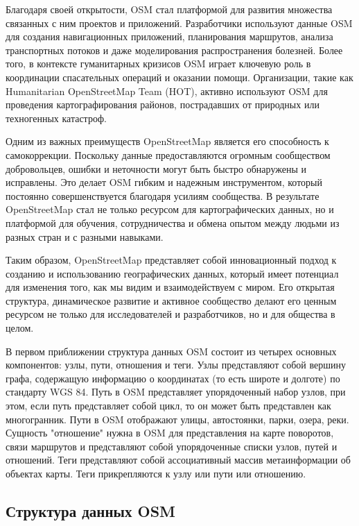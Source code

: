 Благодаря своей открытости, OSM стал платформой для развития множества связанных с ним проектов и приложений. Разработчики используют данные OSM для создания навигационных приложений, планирования маршрутов, анализа транспортных потоков и даже моделирования распространения болезней. Более того, в контексте гуманитарных кризисов OSM играет ключевую роль в координации спасательных операций и оказании помощи. Организации, такие как Humanitarian OpenStreetMap Team (HOT), активно используют OSM для проведения картографирования районов, пострадавших от природных или техногенных катастроф.

Одним из важных преимуществ OpenStreetMap является его способность к самокоррекции. Поскольку данные предоставляются огромным сообществом добровольцев, ошибки и неточности могут быть быстро обнаружены и исправлены. Это делает OSM гибким и надежным инструментом, который постоянно совершенствуется благодаря усилиям сообщества. В результате OpenStreetMap стал не только ресурсом для картографических данных, но и платформой для обучения, сотрудничества и обмена опытом между людьми из разных стран и с разными навыками.

Таким образом, OpenStreetMap представляет собой инновационный подход к созданию и использованию географических данных, который имеет потенциал для изменения того, как мы видим и взаимодействуем с миром. Его открытая структура, динамическое развитие и активное сообщество делают его ценным ресурсом не только для исследователей и разработчиков, но и для общества в целом.

В первом приближении структура данных OSM состоит из четырех основных компонентов: узлы, пути, отношения и теги. Узлы представляют собой вершину графа, содержащую информацию о координатах (то есть широте и долготе) по стандарту WGS 84. Путь в OSM представляет упорядоченный набор узлов, при этом, если путь представляет собой цикл, то он может быть представлен как многогранник. Пути в OSM отображают улицы, автостоянки, парки, озера, реки. Сущность "отношение" нужна в OSM для представления на карте поворотов, связи маршрутов и представляют собой упорядоченные списки узлов, путей и отношений. Теги представляют собой ассоциативный массив  метаинформации об объектах карты. Теги прикрепляются к узлу или пути или отношению.

\subsection{Структура данных OSM}

